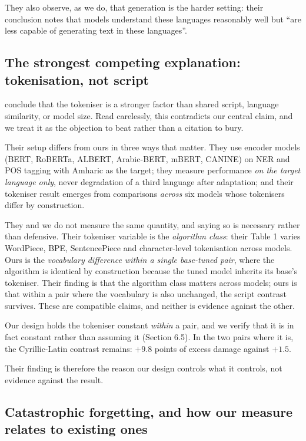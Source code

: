 \documentclass[final]{clv2025}
\begin{document}
They also observe, as we do, that generation is the harder setting: their
conclusion notes that models understand these languages reasonably well but
``are less capable of generating text in these languages''.

\subsection{The strongest competing explanation: tokenisation, not script}

 conclude that the tokeniser is a stronger factor
than shared script, language similarity, or model size. Read carelessly, this
contradicts our central claim, and we treat it as the objection to beat rather
than a citation to bury.

Their setup differs from ours in three ways that matter. They use encoder
models (BERT, RoBERTa, ALBERT, Arabic-BERT, mBERT, CANINE) on NER and POS
tagging with Amharic as the target; they measure performance \emph{on the
target language only}, never degradation of a third language after adaptation;
and their tokeniser result emerges from comparisons \emph{across} six models
whose tokenisers differ by construction.

They and we do not measure the same quantity, and saying so is necessary rather
than defensive. Their tokeniser variable is the \emph{algorithm class}: their
Table 1 varies WordPiece, BPE, SentencePiece and character-level tokenisation
across models. Ours is the \emph{vocabulary difference within a single
base-tuned pair}, where the algorithm is identical by construction because the
tuned model inherits its base's tokeniser. Their finding is that the algorithm
class matters across models; ours is that within a pair where the vocabulary is
also unchanged, the script contrast survives. These are compatible claims, and
neither is evidence against the other.

Our design holds the tokeniser constant \emph{within} a pair, and we verify
that it is in fact constant rather than assuming it (Section 6.5). In the two
pairs where it is, the Cyrillic-Latin contrast remains: $+9.8$ points of excess
damage against $+1.5$.

Their finding is therefore the reason our design controls what it controls, not
evidence against the result.

\subsection{Catastrophic forgetting, and how our measure relates to existing
ones}
\end{document}

